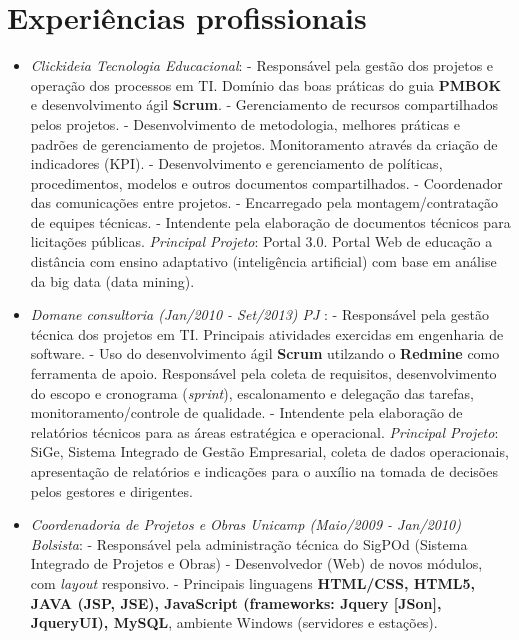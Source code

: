 \documentclass[a4paper,10pt]{article}
\begin{document}
\section{Experiências profissionais}
\begin{itemize}

\item \emph{Clickideia Tecnologia Educacional}: 
  \subitem - Responsável pela gestão dos projetos e operação dos processos em TI. Domínio das boas práticas do guia  \textbf{PMBOK} e desenvolvimento ágil \textbf{Scrum}.
  \subitem - Gerenciamento de recursos compartilhados pelos projetos.
  \subitem - Desenvolvimento de metodologia, melhores práticas e padrões de gerenciamento de projetos. Monitoramento através da criação de indicadores (KPI).
  \subitem - Desenvolvimento e gerenciamento de políticas, procedimentos, modelos e outros documentos compartilhados.
  \subitem - Coordenador das comunicações entre projetos.
  \subitem - Encarregado pela montagem/contratação de equipes técnicas.
  \subitem - Intendente pela elaboração de documentos técnicos para licitações públicas.
  \subitem \emph{Principal Projeto}: Portal 3.0. Portal Web de educação a distância com ensino adaptativo (inteligência artificial) com base em análise da big data (data mining).

\item \emph{Domane consultoria (Jan/2010 - Set/2013) PJ }: 
  \subitem - Responsável pela gestão técnica dos projetos em TI. Principais atividades exercidas em engenharia de software.
  \subitem - Uso do desenvolvimento ágil \textbf{Scrum} utilzando o \textbf{Redmine} como ferramenta de apoio. Responsável pela coleta de requisitos, desenvolvimento do escopo e cronograma (\textit{sprint}), escalonamento e delegação das tarefas, monitoramento/controle de qualidade.
  \subitem - Intendente pela elaboração de relatórios técnicos para as áreas estratégica e operacional.
  \subitem \emph{Principal Projeto}:  SiGe, Sistema Integrado de Gestão Empresarial, coleta de dados operacionais, apresentação de relatórios e indicações para o auxílio na tomada de decisões pelos gestores e dirigentes.

\item \emph{Coordenadoria de Projetos e Obras Unicamp (Maio/2009 - Jan/2010) Bolsista}: 
  \subitem - Responsável pela administração técnica do SigPOd (Sistema Integrado de Projetos e Obras)
  \subitem - Desenvolvedor (Web) de novos módulos, com \textit{layout} responsivo.
  \subitem - Principais linguagens \textbf{HTML/CSS, HTML5, JAVA (JSP, JSE), JavaScript (frameworks: Jquery [JSon], JqueryUI), MySQL}, ambiente Windows (servidores e estações).
  

\end{itemize}
\end{document}

